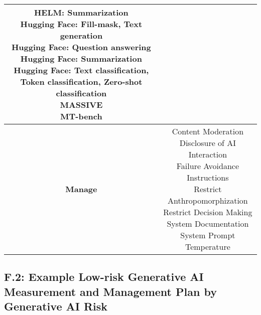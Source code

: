 \documentclass[fleqn]{article}
\begin{document}
\begin{table}[H]
\begin{tabular}{|c|c|}
{			\textbullet\hspace{3pt} HELM: Summarization \\ 
			\textbullet\hspace{3pt} Hugging Face: Fill-mask, Text generation  \\ 
			\textbullet\hspace{3pt} Hugging Face: Question answering \\ 
			\textbullet\hspace{3pt} Hugging Face: Summarization \\ 
			\textbullet\hspace{3pt} Hugging Face: Text classification, Token classification, Zero-shot classification \\ 
			\textbullet\hspace{3pt} MASSIVE  \\ 
			\textbullet\hspace{3pt} MT-bench \\ 
		}		
		\\
		\hline		
		\textbf{Manage} &
		\makecell[l]{ 	
			\textbullet\hspace{3pt} Content Moderation \\ 
			\textbullet\hspace{3pt} Disclosure of AI Interaction \\ 
			\textbullet\hspace{3pt} Failure Avoidance \\
			\textbullet\hspace{3pt} Instructions\\ 	
			\textbullet\hspace{3pt} Restrict Anthropomorphization \\		
			\textbullet\hspace{3pt} Restrict Decision Making \\ 					 
			\textbullet\hspace{3pt} System Documentation\\ 			
			\textbullet\hspace{3pt} System Prompt \\ 
			\textbullet\hspace{3pt} Temperature \\ 	
		}
		\\
		\hline
	\end{tabular}
	\label{table:low_risk_plan_by_tc_cont2}
\end{table}

\subsection*{F.2: Example Low-risk Generative AI Measurement and Management Plan by Generative AI Risk}\label{appdxf2}
\end{document}
